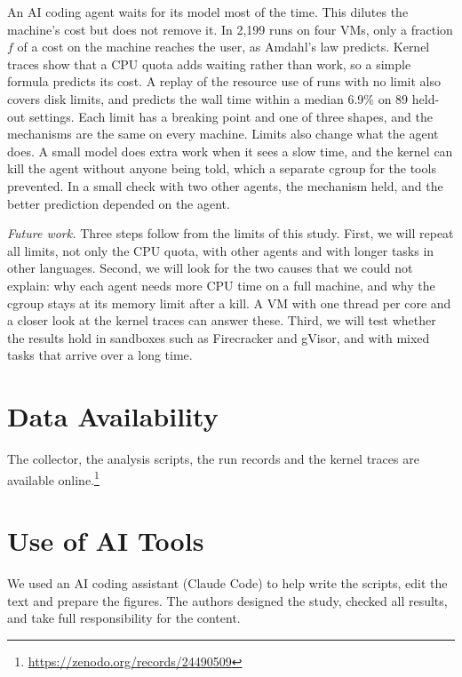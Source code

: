 \documentclass[sigconf,review,anonymous]{acmart}
\begin{document}
An AI coding agent waits for its model most of the time. This dilutes
the machine's cost but does not remove it. In 2,199 runs on four VMs,
only a fraction $f$ of a cost on the machine reaches the user, as
Amdahl's law predicts. Kernel traces show that a CPU quota adds waiting
rather than work, so a simple formula predicts its cost. A replay of the
resource use of runs with no limit also covers disk limits, and predicts
the wall time within a median 6.9\% on 89 held-out settings. Each limit
has a breaking point and one of three shapes, and the mechanisms are the
same on every machine. Limits also change what the agent does. A small
model does extra work when it sees a slow time, and the kernel can kill
the agent without anyone being told, which a separate cgroup for the
tools prevented. In a small check with two other agents, the mechanism
held, and the better prediction depended on the agent.

\emph{Future work.} Three steps follow from the limits of this study.
First, we will repeat all limits, not only the CPU quota, with other
agents and with longer tasks in other languages. Second, we will look
for the two causes that we could not explain: why each agent needs more
CPU time on a full machine, and why the cgroup stays at its memory limit
after a kill. A VM with one thread per core and a closer look at the
kernel traces can answer these. Third, we will test whether the results
hold in sandboxes such as Firecracker and gVisor, and with mixed tasks
that arrive over a long time.

\section*{Data Availability}
The collector, the analysis scripts, the run records and the kernel
traces are available online.\footnote{\url{https://zenodo.org/records/24490509}}

\section*{Use of AI Tools}
We used an AI coding assistant (Claude Code) to help write the scripts,
edit the text and prepare the figures. The authors designed the study,
checked all results, and take full responsibility for the content.


\end{document}
